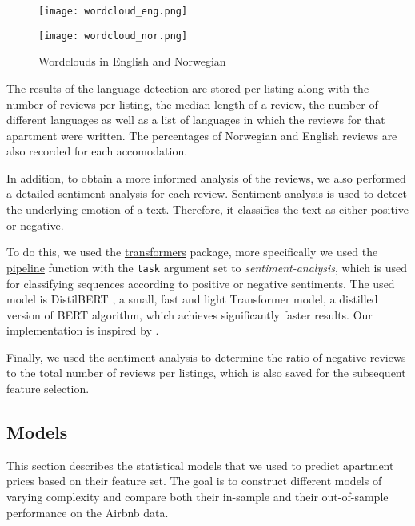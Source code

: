 \begin{figure}[t]
  \centering
  \begin{minipage}{6.7cm}
    \texttt{[image: wordcloud\_eng.png]}
  \end{minipage}
  \begin{minipage}{6.7cm}
    \texttt{[image: wordcloud\_nor.png]}
  \end{minipage}
  \caption{Wordclouds in English and Norwegian}
  \label{fig:wordclouds}
\end{figure}

The results of the language detection are stored per listing along with the number of reviews per listing, the median length of a review, the number of different languages as well as a list of languages in which the reviews for that apartment were written.
The percentages of Norwegian and English reviews are also recorded for each accomodation.

In addition, to obtain a more informed analysis of the reviews, we also performed a detailed sentiment analysis for each review.
Sentiment analysis is used to detect the underlying emotion of a text.
Therefore, it classifies the text as either positive or negative.

To do this, we used the \href{https://huggingface.co/transformers/v3.0.2/model_doc/distilbert.html}{transformers} package, more specifically we used the \href{https://huggingface.co/transformers/v3.0.2/main_classes/pipelines.html}{pipeline} function with the \texttt{task} argument set to \textit{sentiment-analysis}, which is used for classifying sequences according to positive or negative sentiments.
The used model is DistilBERT \citep{sanh2020}, a small, fast and light Transformer model, a distilled version of BERT \citep{devlin2019} algorithm, which achieves significantly faster results.
Our implementation is inspired by \citep{selvaraj2020}.

Finally, we used the sentiment analysis to determine the ratio of negative reviews to the total number of reviews per listings, which is also saved for the subsequent feature selection.

\subsection{Models}

This section describes the statistical models that we used to predict apartment prices based on their feature set.
The goal is to construct different models of varying complexity and compare both their in-sample and their out-of-sample performance on the Airbnb data.

